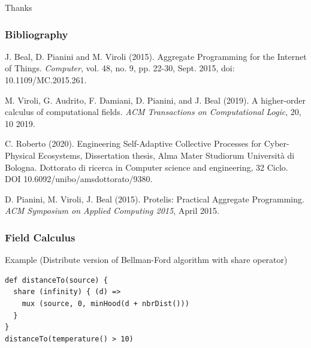 \begin{frame}
\centering
\Huge Thanks
\end{frame}

\begin{frame}
\frametitle{Bibliography}
J. Beal, D. Pianini and M. Viroli (2015). Aggregate Programming for the Internet of Things. \textit{Computer}, vol. 48, no. 9, pp. 22-30, Sept. 2015, doi: 10.1109/MC.2015.261.

\medskip

M. Viroli, G. Audrito, F. Damiani, D. Pianini, and J. Beal (2019). A higher-order calculus of computational fields. \textit{ACM Transactions on Computational Logic}, 20, 10 2019.

\medskip

C. Roberto (2020). Engineering Self-Adaptive Collective Processes for Cyber-Physical Ecosystems, Dissertation thesis, Alma Mater Studiorum Università di Bologna.  Dottorato di ricerca in Computer science and engineering, 32 Ciclo. DOI 10.6092/unibo/amsdottorato/9380.

\medskip

D. Pianini, M. Viroli, J. Beal (2015). Protelis: Practical Aggregate Programming. \textit{ACM Symposium on Applied Computing 2015}, April 2015.
\end{frame}


\begin{frame}[fragile]
\frametitle{Field Calculus}
	\begin{block}{Example (Distribute version of Bellman-Ford algorithm with share operator)}
\begin{lstlisting}[]
def distanceTo(source) {
  share (infinity) { (d) =>
    mux (source, 0, minHood(d + nbrDist()))
  }
}
distanceTo(temperature() > 10)
\end{lstlisting}
\end{block}
\end{frame}


